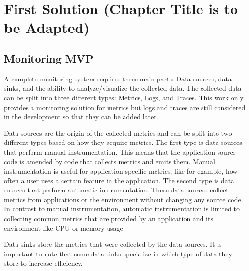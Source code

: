 \chapter{First Solution (Chapter Title is to be Adapted)}



\section{Monitoring MVP}


A complete monitoring system requires three main parts: Data sources, data sinks, and the ability
to analyze/visualize the collected data. 
The collected data can be split into three different types: Metrics, Logs, and Traces.
This work only provides a monitoring solution for metrics but logs and traces are still considered
in the development so that they can be added later.

Data sources are the origin of the collected metrics and can be split into two different types
based on how they acquire metrics. The first type is data sources that perform manual instrumentation.
This means that the application source code is amended by code that collects metrics and emits them.
Manual instrumentation is useful for application-specific metrics, like for example, how often a user
uses a certain feature in the application.
The second type is data sources that perform automatic instrumentation.
These data sources collect metrics from applications or the environment without changing any source code.
In contrast to manual instrumentation, automatic instrumentation is limited to collecting
common metrics that are provided by an application and its environment like CPU or memory usage.

Data sinks store the metrics that were collected by the data sources.
It is important to note that some data sinks specialize in which type of data they store
to increase efficiency.

